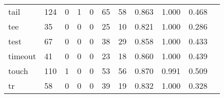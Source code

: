 \begin{longtable}{lp{1.20cm}p{1.20cm}p{1.20cm}p{1.20cm}p{1.20cm}p{1.20cm}p{1.20cm}p{1.20cm}p{1.20cm}p{1.20cm}}
tail      &                                   124 &                                                  0 &                                                  1 &                                                  0 &                                                 65 &                                                 58 &                                         0.863 &                                              1.000 &                                              0.468 \\
tee       &                                    35 &                                                  0 &                                                  0 &                                                  0 &                                                 25 &                                                 10 &                                         0.821 &                                              1.000 &                                              0.286 \\
test      &                                    67 &                                                  0 &                                                  0 &                                                  0 &                                                 38 &                                                 29 &                                         0.858 &                                              1.000 &                                              0.433 \\
timeout   &                                    41 &                                                  0 &                                                  0 &                                                  0 &                                                 23 &                                                 18 &                                         0.860 &                                              1.000 &                                              0.439 \\
touch     &                                   110 &                                                  1 &                                                  0 &                                                  0 &                                                 53 &                                                 56 &                                         0.870 &                                              0.991 &                                              0.509 \\
tr        &                                    58 &                                                  0 &                                                  0 &                                                  0 &                                                 39 &                                                 19 &                                         0.832 &                                              1.000 &                                              0.328 \\

\end{longtable}
